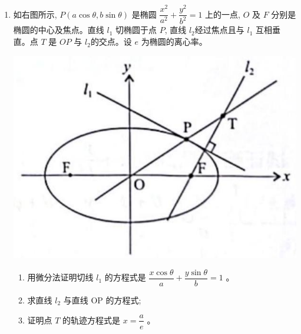 \documentclass[10pt]{article}
\begin{document}
\begin{enumerate}
\item 如右图所示, $P(a \cos \theta, b \sin \theta)$ 是椭圆 $\dfrac{x^{2}}{a^{2}}+\dfrac{y^{2}}{b^{2}}=1$ 上的一点, $O$ 及 $F$ 分别是椭圆的中心及焦点。直线 $l_{1}$ 切椭圆于点 $P$, 直线 $l_{2}$经过焦点且与 $l_{1}$ 互相垂直。点 $T$ 是 $OP$ 与 $l_{2}$的交点。设 $e$ 为椭圆的离心率。
\begin{center}
\includegraphics[max width=\textwidth]{2024_06_05_971e6815482d5ecd2718g-21}
\end{center}
  \begin{enumerate}
    \item 用微分法证明切线 $l_{1}$ 的方程式是 $\dfrac{x \cos \theta}{a}+\dfrac{y \sin \theta}{b}=1$ 。
    \item 求直线 $l_{2}$ 与直线 OP 的方程式;
    \item 证明点 $T$ 的轨迹方程式是 $x=\dfrac{a}{e}$ 。
  \end{enumerate}

\end{enumerate}
\end{document}
